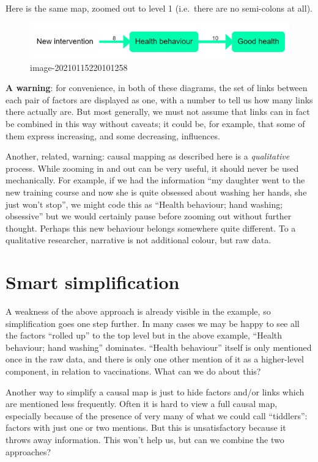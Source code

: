 \documentclass[
]{book}
\begin{document}
Here is the same map, zoomed out to level 1 (i.e.~there are no semi-colons at all).

\begin{figure}
\centering
\includegraphics{_assets/image-20210115220101258.png}
\caption{image-20210115220101258}
\end{figure}

\textbf{A warning}: for convenience, in both of these diagrams, the set of links between each pair of factors are displayed as one, with a number to tell us how many links there actually are. But most generally, we must not assume that links can in fact be combined in this way without caveats; it could be, for example, that some of them express increasing, and some decreasing, influences.

Another, related, warning: causal mapping as described here is a \emph{qualitative} process. While zooming in and out can be very useful, it should never be used mechanically. For example, if we had the information ``my daughter went to the new training course and now she is quite obsessed about washing her hands, she just won't stop'', we might code this as ``Health behaviour; hand washing; obsessive'' but we would certainly pause before zooming out without further thought. Perhaps this new behaviour belongs somewhere quite different. To a qualitative researcher, narrative is not additional colour, but raw data.

\hypertarget{smart-simplification}{%
\chapter{Smart simplification}\label{smart-simplification}}

A weakness of the above approach is already visible in the example, so simplification goes one step further. In many cases we may be happy to see all the factors ``rolled up'' to the top level but in the above example, ``Health behaviour; hand washing'' dominates. ``Health behaviour'' itself is only mentioned once in the raw data, and there is only one other mention of it as a higher-level component, in relation to vaccinations. What can we do about this?

Another way to simplify a causal map is just to hide factors and/or links which are mentioned less frequently. Often it is hard to view a full causal map, especially because of the presence of very many of what we could call ``tiddlers'': factors with just one or two mentions. But this is unsatisfactory because it throws away information. This won't help us, but can we combine the two approaches?
\end{document}
